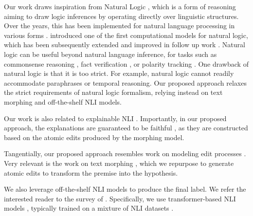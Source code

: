 Our work draws inspiration from Natural Logic \cite{Lakoff1970LinguisticsAN}, which is a form of reasoning aiming to draw logic inferences by operating directly over linguistic structures. 
Over the years, this has been implemented for natural language processing in various forms \cite{MacCartney2007NaturalLF, Krishna2021ProoFVerNL, rozanova-etal-2022-decomposing, feng-etal-2022-neuro, korakakis-vlachos-2023-improving}. \citet{MacCartney2007NaturalLF} introduced one of the first computational models for natural logic, which has been subsequently extended and improved in follow up work \cite{MacCartney2008ModelingSC, MacCartney2009AnEM}. 
Natural logic can be useful beyond natural language inference, for tasks such as commonsense reasoning \cite{angeli-manning-2014-naturalli}, fact verification \cite{krishna2022proofver, Strong2024ZeroShotFV}, or polarity tracking \cite{hu-moss-2018-polarity}. 
One drawback of natural logic is that it is too strict. For example, natural logic cannot readily accommodate paraphrases or temporal reasoning. Our proposed approach relaxes the strict requirements of natural logic formalism, relying instead on text morphing \cite{huang2018text} and off-the-shelf NLI models. 

Our work is also related to explainable NLI \cite[ inter alia]{camburu2018explainablenli, Thorne2019GeneratingTE, camburu-etal-2020-make}. Importantly, in our proposed approach, the explanations are guaranteed to be faithful \cite{Kumar2020NILEN}, as they are constructed based on the atomic edits produced by the morphing model.

Tangentially, our proposed approach resembles work on modeling edit processes \cite{guu-etal-2018-generating, awasthi-etal-2019-parallel, reid-neubig-2022-learning, reid2023diffuser}. Very relevant is the work on text morphing \cite{huang2018text}, which we repurpose to generate atomic edits to transform the premise into the hypothesis. %

We also leverage off-the-shelf NLI models to produce the final label. We refer the interested reader to the survey of \citet{Storks2019RecentAI}. Specifically, we use transformer-based NLI models \cite{Vaswani2017AttentionIA, Devlin2019BERTPO, Liu2019RoBERTaAR, Lewis2019BARTDS}, typically trained on a mixture of NLI datasets \cite{sick, bowman2015large, williams-etal-2018-broad}. 



